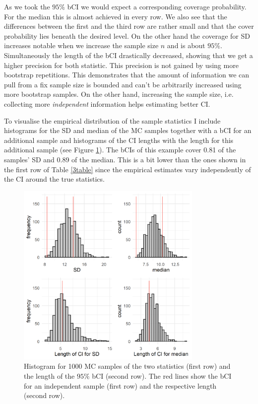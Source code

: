 As we took the $95\%$ bCI we would expect a corresponding coverage probability. For the median this is almost achieved in every row. We also see that the differences between the first and the third row are rather small and that the cover probability lies beneath the desired level. On the other hand the coverage for SD increases notable when we increase the sample size $n$ and is about $95\%$. Simultaneously the length of the bCI drastically decreased, showing that we get a higher precision for both statistic. This precision is not gained by using more bootstrap repetitions. This demonstrates that the amount of information we can pull from a fix sample size is bounded and can't be arbitrarily increased using more bootstrap samples. On the other hand, increasing the sample size, i.e. collecting more \textit{independent} information helps estimating better CI. 

To visualise the empirical distribution of the sample statistics I include histograms for the SD and median of the MC samples together with a bCI for an additional sample and histograms of the CI lengths with the length for this additional sample (see Figure \ref{3hist}). The bCIs of this example cover 0.81 of the samples' SD and 0.89 of the median. This is a bit lower than the ones shown in the first row of Table \ref{3table} since the empirical estimates vary independently of the CI around the true statistics.
\begin{figure}[thb]
\centering
\includegraphics[width=0.8\textwidth, keepaspectratio]{ex3/MChist.png}
\caption{Histogram for 1000 MC samples of the two statistics (first row) and the length of the $95\%$ bCI (second row). The red lines show the bCI for an independent sample (first row) and the respective length (second row).}
\label{3hist}
\end{figure}  

